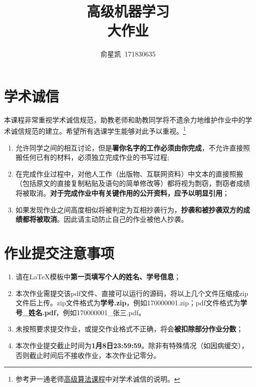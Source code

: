 \documentclass[a4paper,UTF8]{article}
\numberwithin{equation}{section}
\begin{document}
\title{高级机器学习\\
大作业}
\author{俞星凯\, 171830635} 
\maketitle

\section*{学术诚信}

本课程非常重视学术诚信规范，助教老师和助教同学将不遗余力地维护作业中的学术诚信规范的建立。希望所有选课学生能够对此予以重视。\footnote{参考尹一通老师\href{http://tcs.nju.edu.cn/wiki/}{高级算法课程}中对学术诚信的说明。}

\begin{tcolorbox}
	\begin{enumerate}
		\item[(1)] 允许同学之间的相互讨论，但是{\color{red}\textbf{署你名字的工作必须由你完成}}，不允许直接照搬任何已有的材料，必须独立完成作业的书写过程;
		\item[(2)] 在完成作业过程中，对他人工作（出版物、互联网资料）中文本的直接照搬（包括原文的直接复制粘贴及语句的简单修改等）都将视为剽窃，剽窃者成绩将被取消。{\color{red}\textbf{对于完成作业中有关键作用的公开资料，应予以明显引用}}；
		\item[(3)] 如果发现作业之间高度相似将被判定为互相抄袭行为，{\color{red}\textbf{抄袭和被抄袭双方的成绩都将被取消}}。因此请主动防止自己的作业被他人抄袭。
	\end{enumerate}
\end{tcolorbox}

\section*{作业提交注意事项}
\begin{tcolorbox}
	\begin{enumerate}
		\item[(1)] 请在LaTeX模板中{\color{red}\textbf{第一页填写个人的姓名、学号信息}}；
		\item[(2)] 本次作业需提交该pdf文件、直接可以运行的源码，将以上几个文件压缩成zip文件后上传。zip文件格式为{\color{red}\textbf{学号.zip}}，例如170000001.zip；pdf文件格式为{\color{red}\textbf{学号\_姓名.pdf}}，例如170000001\_张三.pdf。
		\item[(3)] 未按照要求提交作业，或提交作业格式不正确，将会{\color{red}\textbf{被扣除部分作业分数}}；
		\item[(4)] 本次作业提交截止时间为{\color{red}\textbf{1月8日23:59:59}}。除非有特殊情况（如因病缓交），否则截止时间后不接收作业，本次作业记零分。
	\end{enumerate}
\end{tcolorbox}
\end{document}
